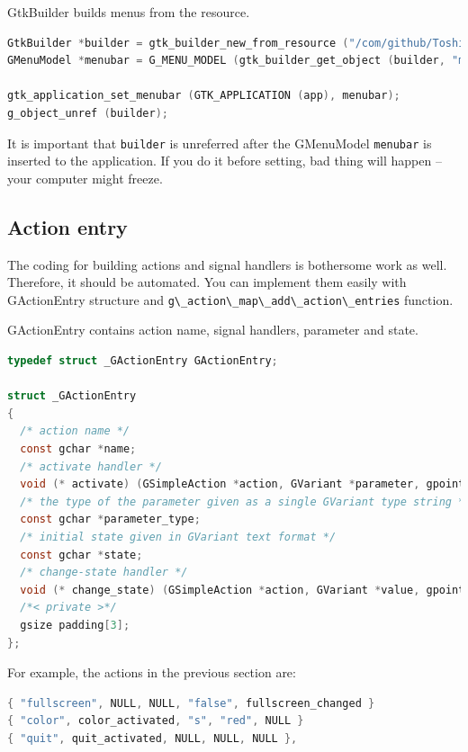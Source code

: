 GtkBuilder builds menus from the resource.

\begin{lstlisting}[language=C]
GtkBuilder *builder = gtk_builder_new_from_resource ("/com/github/ToshioCP/menu3/menu3.ui");
GMenuModel *menubar = G_MENU_MODEL (gtk_builder_get_object (builder, "menubar"));

gtk_application_set_menubar (GTK_APPLICATION (app), menubar);
g_object_unref (builder);
\end{lstlisting}

It is important that \passthrough{\lstinline!builder!} is unreferred
after the GMenuModel \passthrough{\lstinline!menubar!} is inserted to
the application. If you do it before setting, bad thing will happen --
your computer might freeze.

\hypertarget{action-entry}{%
\subsection{Action entry}\label{action-entry}}

The coding for building actions and signal handlers is bothersome work
as well. Therefore, it should be automated. You can implement them
easily with GActionEntry structure and
\passthrough{\lstinline!g\_action\_map\_add\_action\_entries!} function.

GActionEntry contains action name, signal handlers, parameter and state.

\begin{lstlisting}[language=C]
typedef struct _GActionEntry GActionEntry;

struct _GActionEntry
{
  /* action name */
  const gchar *name;
  /* activate handler */
  void (* activate) (GSimpleAction *action, GVariant *parameter, gpointer user_data);
  /* the type of the parameter given as a single GVariant type string */
  const gchar *parameter_type;
  /* initial state given in GVariant text format */
  const gchar *state;
  /* change-state handler */
  void (* change_state) (GSimpleAction *action, GVariant *value, gpointer user_data);
  /*< private >*/
  gsize padding[3];
};
\end{lstlisting}

For example, the actions in the previous section are:

\begin{lstlisting}[language=C]
{ "fullscreen", NULL, NULL, "false", fullscreen_changed }
{ "color", color_activated, "s", "red", NULL }
{ "quit", quit_activated, NULL, NULL, NULL },
\end{lstlisting}

